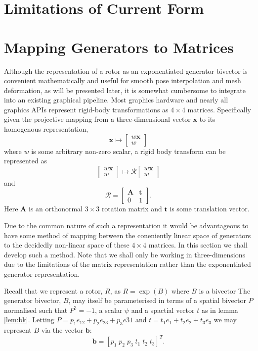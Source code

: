 \section{Limitations of Current Form}


\section{Mapping Generators to Matrices}

Although the representation of a rotor as an exponentiated generator bivector
is convenient mathematically and useful for smooth pose interpolation
and mesh deformation, as will be presented later, it is somewhat cumbersome
to integrate into an existing graphical pipeline. Most graphics hardware and
nearly all graphics APIs represent rigid-body transformations as $4 \times 4$ matrices.
Specifically given the projective mapping from a three-dimensional vector $\mathbf{x}$ to
its homogenous representation,
\[
\mathbf{x} \mapsto \left[ \begin{array}{c}
w \mathbf{x} \\ w
\end{array}\right]
\]
where $w$ is some arbitrary non-zero scalar, a rigid body transform can be represented as
\[
 \left[ \begin{array}{c}
w \mathbf{x} \\ w
\end{array}\right]
\mapsto
 \mathcal{R}\left[ \begin{array}{c}
w \mathbf{x} \\ w
\end{array}\right]
\]
and
\[
\mathcal{R} = \left[
\begin{array}{cc}
\mathbf{A} & \mathbf{t} \\
                0 & 1
\end{array}
\right].
\]
Here $\mathbf{A}$ is an orthonormal $3 \times 3$ rotation matrix and $\mathbf{t}$ is some
translation vector.

Due to the common nature of such a representation it would be advantageous
to have some method of mapping between the coneniently linear space of generators
to the decidedly non-linear space of these $4 \times 4$ matrices. In this section
we shall develop such a method. Note that we shall only be working in three-dimensions due
to the limitations of the matrix representation rather than the exponentiated
generator representation.

Recall that we represent a rotor, $R$, as $R = \exp(B)$ where $B$ is a bivector
The generator bivector, $B$, may itself be
parameterised in terms of a spatial bivector $P$ normalised such that
$P^2 = -1$, a scalar $\psi$ and a spactial vector $t$
as in lemma \ref{lem:bk}.
Letting $P = p_1 e_{12} + p_2 e_{23} + p_3 e{31}$ and
$t = t_1 e_1 + t_2 e_2 + t_3 e_3$ we may represent $B$ via the
vector $\mathbf{b}$:
\[
\mathbf{b} = [ p_1 \; p_2 \; p_3 \; t_1 \; t_2 \; t_3 ]^T.
\]

